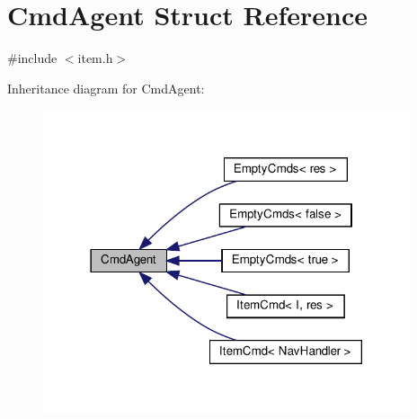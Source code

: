 \hypertarget{structCmdAgent}{}\section{Cmd\+Agent Struct Reference}
\label{structCmdAgent}


{\ttfamily \#include $<$item.\+h$>$}



Inheritance diagram for Cmd\+Agent\+:\nopagebreak
\begin{figure}[H]
\begin{center}
\leavevmode
\includegraphics[width=306pt]{structCmdAgent__inherit__graph}
\end{center}
\end{figure}
